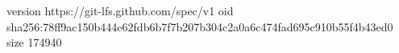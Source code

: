 version https://git-lfs.github.com/spec/v1
oid sha256:78ff9ac150b444e62fdb6b7f7b207b304c2a0a6c474fad695c910b55f4b43ed0
size 174940
